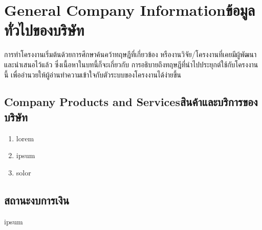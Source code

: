 \chapter{\ifenglish General Company Information\else ข้อมูลทั่วไปของบริษัท\fi}

การทําโครงงานเริ่มต้นด้วยการศึกษาค้นคว้าทฤษฎีที่เกี่ยวข้อง หรืองานวิจัย/โครงงานที่เคยมีผู้พัฒนาและนําเสนอไว้แล้ว ซึ่งเนื้อหาในบทนี้ก็จะเกี่ยวกับ
การอธิบายถึงทฤษฎีที่นำไปประยุกต์ใช้กับโครงงานนี้ เพื่ออำนวยให้ผู้อ่านทำความเข้าใจกับตัวระบบของโครงงานได้ง่ายขึ้น

\section{\ifenglish Company Products and Services\else สินค้าและบริการของบริษัท \fi}
\begin{enumerate}
  \item lorem
  \item ipsum
  \item solor
\end{enumerate}


\section{สถานะงบการเงิน}
ipsum